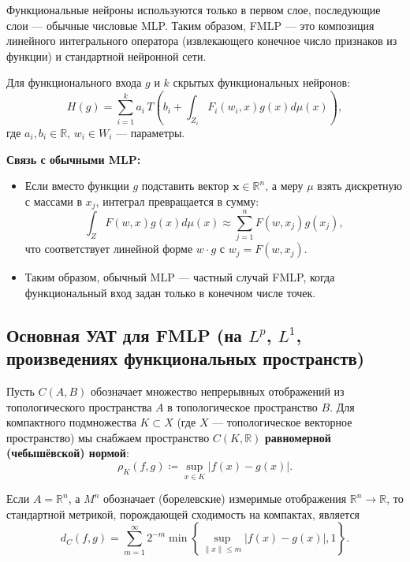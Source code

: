 \documentclass[../NDCNNAI_main.tex]{subfiles}
\begin{document}
	Функциональные нейроны используются только в первом слое, последующие слои --- обычные числовые MLP. Таким образом, FMLP --- это композиция линейного интегрального оператора (извлекающего конечное число признаков из функции) и стандартной нейронной сети.
	
	\begin{definition}
		Для функционального входа $g$ и $k$ скрытых функциональных нейронов:
		\[
		H(g) = \sum_{i=1}^{k} a_i \, T\left( b_i + \int_{Z_i} F_i(w_i, x) g(x) d\mu(x) \right),
		\]
		где $a_i, b_i \in \mathbb{R}$, $w_i \in W_i$ --- параметры.
	\end{definition}
	
	\textbf{Связь с обычными MLP:}
	\begin{itemize}
		\item Если вместо функции $g$ подставить вектор $\mathbf{x} \in \mathbb{R}^n$, а меру $\mu$ взять дискретную с массами в $x_j$, интеграл превращается в сумму:
		\[
		\int_Z F(w, x) g(x) d\mu(x) \approx \sum_{j=1}^n F(w, x_j) g(x_j),
		\]
		что соответствует линейной форме $w \cdot g$ с $w_j = F(w, x_j)$.
		
		\item Таким образом, обычный MLP --- частный случай FMLP, когда функциональный вход задан только в конечном числе точек.
		
	\end{itemize}
	

\subsection{Основная УАТ для FMLP (на $L^p$, $L^1$, произведениях функциональных пространств)}

Пусть \( C(A, B) \) обозначает множество непрерывных отображений из топологического пространства \( A \) в топологическое пространство \( B \). Для компактного подмножества \( K \subset X \) (где \( X \) --- топологическое векторное пространство) мы снабжаем пространство \( C(K, \mathbb{R}) \) \textbf{равномерной (чебышёвской) нормой}:
\[
\rho_K(f, g) \coloneq \sup_{x \in K} |f(x) - g(x)|.
\]

Если \( A = \mathbb{R}^n \), а \( M^n \) обозначает (борелевские) измеримые отображения \( \mathbb{R}^n \to \mathbb{R} \), то стандартной метрикой, порождающей сходимость на компактах, является
\[
d_C(f, g) = \sum_{m=1}^{\infty} 2^{-m} \min \left\{ \sup_{\|x\| \leq m} |f(x) - g(x)|, 1 \right\}.
\]
\end{document}
